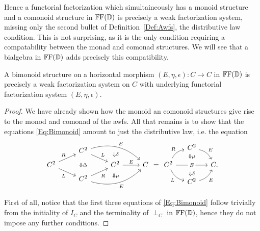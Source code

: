 Hence a functorial factorization which simultaineously has a monoid structure and a comonoid structure in $\mathbb{F}\mathrm{F}(\mathbb{\mathbb{D}})$ is precisely a weak factorization system, missing only the second bullet of Definition~\ref{Def:Awfs}, the distributive law condition. This is not surprising, as it is the only condition requiring a compatability between the monad and comonad structures. We will see that a bialgebra in $\mathbb{F}\mathrm{F}(\mathbb{\mathbb{D}})$ adds precisely this compatibility.

\begin{proposition}
	A bimonoid structure on a horizontal morphism $(E,\eta,\epsilon)\colon C\to C$ in $\mathbb{F}\mathrm{F}(\mathbb{\mathbb{D}})$ is precisely a weak factorization system on $C$ with underlying functorial factorization system $(E,\eta,\epsilon)$. 
\end{proposition}
\begin{proof}
	We have already shown how the monoid an comonoid structures give rise to the monod and comonad of the awfs. All that remains is to show that the equations \eqref{Eq:Bimonoid} amount to just the distributive law, i.e. the equation
	\begin{equation}\label{Eq:AwfsDistributiveLaw}
	\begin{tikzcd}[row sep=tiny, baseline=(B.base)]
		& C^2 \drar{L} \ar[bend left=30]{drr}{E} 
			\twocell[bend left=10]{drr}{\delta} &&\\
		|[alias=B]| C^2 \urar{R} \drar[swap]{L} \twocell{rr}{\Delta}
			&& C^2 \rar{E} & C \\
		& C^2 \urar[swap]{R} \ar[bend right=30]{urr}[swap]{E} 
			\twocell[bend right=10]{urr}{\mu} &&
	\end{tikzcd}
	=
	\begin{tikzcd}[row sep=2ex, column sep=small, bend angle=25, baseline=(B.base)]
		& C^2 \drar[bend left]{E} & \\
		|[alias=B]| C^2 \urar[bend left]{R}
			\twocell[bend left=30]{rr}{\mu}
			\ar{rr}[description]{E}
			\twocell[bend right=30]{rr}{\delta}
			\drar[bend right][swap]{L}
		&& C. \\
		& C^2 \urar[bend right][swap]{E} &
	\end{tikzcd}
	\end{equation}

	First of all, notice that the first three equations of \eqref{Eq:Bimonoid} follow trivially from the initiality of $I_C$ and the terminality of $\perp_C$ in $\mathbb{F}\mathrm{F}(\mathbb{\mathbb{D}})$, hence they do not impose any further conditions.


\end{proof}
